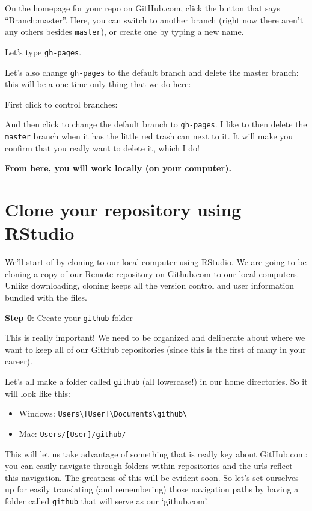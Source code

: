 \documentclass[]{book}
\providecommand{\tightlist}{%
  \setlength{\itemsep}{0pt}\setlength{\parskip}{0pt}}
\begin{document}
On the homepage for your repo on GitHub.com, click the button that says ``Branch:master''. Here, you can switch to another branch (right now there aren't any others besides \texttt{master}), or create one by typing a new name.

Let's type \texttt{gh-pages}.

Let's also change \texttt{gh-pages} to the default branch and delete the master branch: this will be a one-time-only thing that we do here:

First click to control branches:

And then click to change the default branch to \texttt{gh-pages}. I like to then delete the \texttt{master} branch when it has the little red trash can next to it. It will make you confirm that you really want to delete it, which I do!

\textbf{From here, you will work locally (on your computer).}

\hypertarget{clone-your-repository-using-rstudio}{%
\section{Clone your repository using RStudio}\label{clone-your-repository-using-rstudio}}

We'll start of by cloning to our local computer using RStudio. We are going to be cloning a copy of our Remote repository on Github.com to our local computers. Unlike downloading, cloning keeps all the version control and user information bundled with the files.

\textbf{Step 0}: Create your \texttt{github} folder

This is really important! We need to be organized and deliberate about where we want to keep all of our GitHub repositories (since this is the first of many in your career).

Let's all make a folder called \texttt{github} (all lowercase!) in our home directories. So it will look like this:

\begin{itemize}
\tightlist
\item
  Windows: \texttt{Users\textbackslash{}{[}User{]}\textbackslash{}Documents\textbackslash{}github\textbackslash{}}
\item
  Mac: \texttt{Users/{[}User{]}/github/}
\end{itemize}

This will let us take advantage of something that is really key about GitHub.com: you can easily navigate through folders within repositories and the urls reflect this navigation. The greatness of this will be evident soon. So let's set ourselves up for easily translating (and remembering) those navigation paths by having a folder called \texttt{github} that will serve as our `github.com'.
\end{document}

